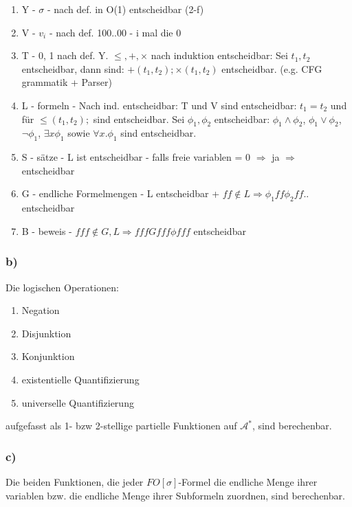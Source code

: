 \documentclass[12pt]{article}
\begin{document}
\begin{enumerate}
  \item Y - $\sigma$ - nach def. in O(1) entscheidbar (2-f)
  \item V - $v_i$ - nach def. 100..00 - i mal die 0
  \item T - 0, 1 nach def. Y. $\leq, +, \times$ nach induktion entscheidbar:
    Sei $t_1, t_2$ entscheidbar, dann sind: $+(t_1,t_2); \times(t_1,t_2)$ entscheidbar. (e.g. CFG grammatik + Parser)
  \item L - formeln - Nach ind. entscheidbar:
    T und V sind entscheidbar: $t_1=t_2$ und für $\leq(t_1,t_2);$ sind entscheidbar.
    Sei $\phi_1, \phi_2$ entscheidbar: $\phi_1\land\phi_2$, $\phi_1\lor\phi_2$, $\neg\phi_1$, $\exists x \phi_1$ sowie $\forall x. \phi_1$ sind entscheidbar.
  \item S - sätze - L ist entscheidbar - falls freie variablen = 0 $\Rightarrow$ ja $\Rightarrow $ entscheidbar
  \item G - endliche Formelmengen - L entscheidbar + $ff\notin L\Rightarrow \phi_1 ff\phi_2 ff..$ entscheidbar
  \item B - beweis - $fff\notin G,L \Rightarrow fffGfff\phi fff$ entscheidbar
\end{enumerate}

\subsubsection*{b)}
Die logischen Operationen:
\begin{enumerate}
  \item Negation
  \item Disjunktion
  \item Konjunktion
  \item existentielle Quantifizierung
  \item universelle Quantifizierung
\end{enumerate}
aufgefasst als 1- bzw 2-stellige partielle Funktionen auf $\mathcal{A}^*$, 
sind berechenbar.


\subsubsection*{c)}
Die beiden Funktionen, die jeder $FO[\sigma]$-Formel die endliche Menge ihrer variablen bzw. die endliche Menge ihrer Subformeln zuordnen, sind berechenbar.
\end{document}
